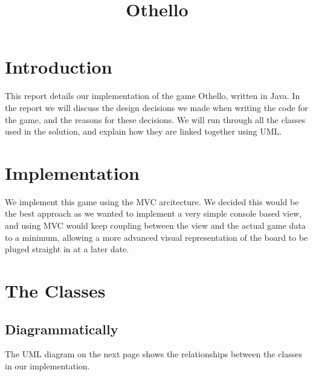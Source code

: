 \documentclass[11pt,a4paper,oneside]{report}
\begin{document}
\title{Othello}

\maketitle

\section*{Introduction}
This report details our implementation of the game Othello, written in Java. In the report we will discuss the design decisions we made when writing the code for the game, and the reasons for these decisions. We will run through all the classes used in the solution, and explain how they are linked together using UML.

\section*{Implementation}
We implement this game using the MVC arcitecture. We decided this would be the best approach as we wanted to implement a very simple console based view, and using MVC would keep coupling between the view and the actual game data to a minimum, allowing a more advanced visual representation of the board to be pluged straight in at a later date.

\section*{The Classes}

\subsection*{Diagrammatically}
The UML diagram on the next page shows the relationships between the classes in our implementation.
\end{document}
